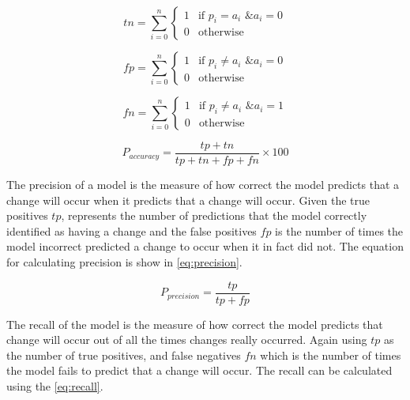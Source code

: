 \begin{equation} 
\label{eq:true_negative}
tn = \sum_{i=0}^{n}\left\{\begin{matrix}
1 & \text{if } p_i = a_i \text{ \& } a_i = 0\\ 
0 & \text{otherwise}
\end{matrix}\right.
\end{equation}

\begin{equation}
\label{eq:false_positive}
fp = \sum_{i=0}^{n}\left\{\begin{matrix}
1 & \text{if } p_i \neq a_i \text{ \& } a_i = 0\\ 
0 & \text{otherwise}
\end{matrix}\right.
\end{equation}

\begin{equation}
\label{eq:false_negative}
fn = \sum_{i=0}^{n}\left\{\begin{matrix}
1 & \text{if } p_i \neq a_i \text{ \& } a_i = 1\\ 
0 & \text{otherwise}
\end{matrix}\right.
\end{equation}

\begin{equation}
\label{eq:prediction_accuracy}
P_{accuracy} = \frac{tp+tn}{tp+tn+fp+fn} \times 100
\end{equation}

The precision of a model is the measure of how correct the model predicts that a change will occur when it predicts that a change will occur. Given the true positives $tp$, represents the number of predictions that the model correctly identified as having a change and the false positives $fp$ is the number of times the model incorrect predicted a change to occur when it in fact did not. The equation for calculating precision is show in \autoref{eq:precision}.



\begin{equation} 
\label{eq:precision}
P_{precision} = \frac{tp}{tp+fp}
\end{equation}

The recall of the model is the measure of how correct the model predicts that change will occur out of all the times changes really occurred. Again using $tp$ as the number of true positives, and false negatives $fn$ which is the number of times the model fails to predict that a change will occur. The recall can be calculated using the \autoref{eq:recall}.

